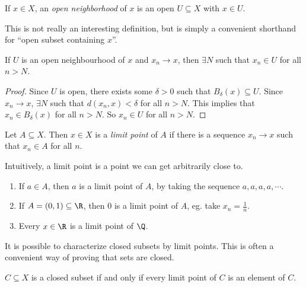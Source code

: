 \documentclass[a4paper]{article}
\begin{document}
\begin{defi}
  If $x\in X$, an \emph{open neighborhood} of $x$ is an open $U\subseteq X$ with $x\in U$.
\end{defi}
This is not really an interesting definition, but is simply a convenient shorthand for ``open subset containing $x$''.

\begin{lemma}
  If $U$ is an open neighbourhood of $x$ and $x_n \to x$, then $\exists N$ such that $x_n \in U$ for all $n > N$.
\end{lemma}

\begin{proof}
  Since $U$ is open, there exists some $\delta > 0$ such that $B_\delta(x)\subseteq U$. Since $x_n \to x$, $\exists N$ such that $d(x_n, x) < \delta$ for all $n > N$. This implies that $x_n \in B_\delta(x)$ for all $n > N$. So $x_n \in U$ for all $n > N$.
\end{proof}

\begin{defi}
  Let $A\subseteq X$. Then $x\in X$ is a \emph{limit point} of $A$ if there is a sequence $x_n \to x$ such that $x_n \in A$ for all $n$.
\end{defi}
Intuitively, a limit point is a point we can get arbitrarily close to.

\begin{eg}\leavevmode
  \begin{enumerate}
    \item If $a\in A$, then $a$ is a limit point of $A$, by taking the sequence $a, a, a, a, \cdots$.
    \item If $A = (0, 1)\subseteq \R$, then $0$ is a limit point of $A$, eg. take $x_n = \frac{1}{n}$.
    \item Every $x\in \R$ is a limit point of $\Q$.
  \end{enumerate}
\end{eg}

It is possible to characterize closed subsets by limit points. This is often a convenient way of proving that sets are closed.
\begin{prop}
  $C\subseteq X$ is a closed subset if and only if every limit point of $C$ is an element of $C$.
\end{prop}
\end{document}
